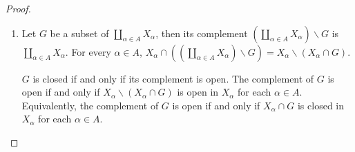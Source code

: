 \begin{proof}
	\begin{enumerate}[label={(\alph*)}]
		\item Let $G$ be a subset of $\coprod_{\alpha\in A}X_{\alpha}$, then its complement $\left(\coprod_{\alpha\in A}X_{\alpha}\right)\smallsetminus G$ is $\coprod_{\alpha\in A}X_{\alpha}$. For every $\alpha\in A$, $X_{\alpha}\cap \left(\left(\coprod_{\alpha\in A}X_{\alpha}\right)\smallsetminus G\right) = X_{\alpha}\smallsetminus (X_{\alpha}\cap G)$.

		      $G$ is closed if and only if its complement is open. The complement of $G$ is open if and only if $X_{\alpha}\smallsetminus (X_{\alpha}\cap G)$ is open in $X_{\alpha}$ for each $\alpha\in A$. Equivalently, the complement of $G$ is open if and only if $X_{\alpha}\cap G$ is closed in $X_{\alpha}$ for each $\alpha\in A$.


\end{enumerate}
\end{proof}
